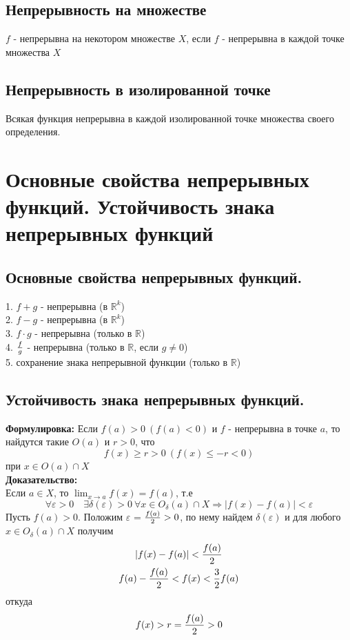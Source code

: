 \subsection{Непрерывность на множестве}
$f$ - непрерывна на некотором множестве $X$, если $f$ - непрерывна в каждой точке множества $X$

\subsection{Непрерывность в изолированной точке}
Всякая функция непрерывна в каждой изолированной точке множества своего определения.

\section{Основные свойства непрерывных функций. Устойчивость знака непрерывных функций}
\subsection{Основные свойства непрерывных функций.}
1. $f + g$ - непрерывна (в $\mathbb{R}^{k}$)\\
2. $f - g$ - непрерывна (в $\mathbb{R}^{k}$)\\
3. $f \cdot g$ - непрерывна (только в $\mathbb{R}$)\\
4. $f \over g$ - непрерывна (только в $\mathbb{R}$, если $g \neq 0 $) \\
5. сохранение знака непрерывной функции (только в $\mathbb{R}$)

\subsection{Устойчивость знака непрерывных функций.}
\textbf{Формулировка:}
Если $f(a) > 0 \ (f(a) < 0 )$ и $f$ - непрерывна в точке $a$, то найдутся такие $O(a)$ и $r>0$, что\\
$$
f(x) \geq r > 0 \ (f(x) \leq -r < 0)
$$
при $x \in O(a) \cap X$\\
\textbf{Доказательство:}\\
Если $a \in X$, то $\lim_{x\to a}{f(x)} = f(a)$, т.е
$$
\forall \varepsilon>0 \quad \exists \delta(\varepsilon)>0 \ \forall x \in O_{\delta}(a) \cap X
\Rightarrow |f(x)- f(a)| < \varepsilon
$$
Пусть $f(a)>0$. Положим $\varepsilon$ = ${f(a)\over 2} > 0$, по нему найдем $\delta(\varepsilon)$ и для любого $x \in O_{\delta}(a) \cap X$ получим
\begin{equation*}
\begin{gathered}
|f(x) - f(a)| < {f(a)\over 2}\\
f(a) - {f(a)\over 2} < f(x) < {3\over 2} f(a)\\
\end{gathered}
\end{equation*}
откуда
$$
f(x)> r = {f(a)\over 2} > 0
$$